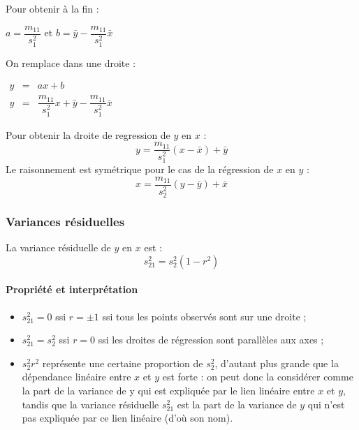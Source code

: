 Pour obtenir à la fin :
\begin{center}
	$\boxed{a = \dfrac{m_{11}}{s_1^2}}$ et $\boxed{b = \bar{y} - \dfrac{m_{11}}{s_1^2} \bar{x}} $
\end{center}
On remplace dans une droite :
\begin{center}
	$\begin{array}{RRL}
		y&=&ax+b\\
		y&=&\dfrac{m_{11}}{s_1^2}x+\bar{y} - \dfrac{m_{11}}{s_1^2} \bar{x}
	\end{array}$
\end{center}
Pour obtenir la droite de regression de $y$ en $x$ :
$$\boxed{y = \dfrac{m_{11}}{s_1^2} (x - \bar{x}) + \bar{y}}$$
Le raisonnement est symétrique pour le cas de la régression de $x$ en $y$ :
$$\boxed{x = \dfrac{m_{11}}{s_2^2} (y - \bar{y}) + \bar{x}}$$





\newpage
\subsubsection{Variances résiduelles}
La variance résiduelle de $y$ en $x$ est :
$$\boxed{s_{21}^2 = s_2^2 (1-r^2)}$$
\paragraph{Propriété et interprétation}
\begin{itemize}
	\item $s_{21}^2 = 0$ ssi $r = \pm1$ ssi tous les points observés sont sur une droite ;
	\item $s_{21}^2 = s_2^2$ ssi $r = 0$ ssi les droites de régression sont parallèles aux axes ;
	\item $s_2^2r^2$ représente une certaine proportion de $s_2^2$, d’autant plus grande que la dépendance linéaire entre $x$ et $y$ est forte : on peut donc la considérer comme la part de la variance de y qui est expliquée par le lien linéaire entre $x$ et $y$, tandis que la variance résiduelle $s_{21}^2$ est la part de la variance de $y$ qui n’est pas expliquée par ce lien linéaire (d’où son nom).
\end{itemize}
